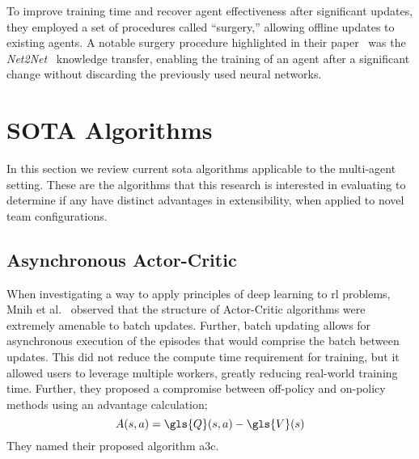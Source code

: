 To improve training time and recover agent effectiveness after 
significant updates, they employed a set of procedures called 
``surgery,'' allowing offline updates to existing agents. 
A notable surgery procedure highlighted in their paper~\cite{berner2019} 
was the \emph{Net2Net}~\cite{chen2016} knowledge transfer, 
enabling the training of an agent after a significant change 
without discarding the previously used neural networks.




\section{SOTA Algorithms} 

In this section we review current \gls{sota} algorithms
applicable to the multi-agent setting.
These are the algorithms that this research is interested 
in evaluating to determine if any have distinct advantages
in extensibility, when applied to novel team configurations.

%

    \subsection*{Asynchronous Actor-Critic}

When investigating a way to apply principles of deep learning to \gls{rl}
problems, Mnih et al.~\cite{mnih2016} observed that the structure of
Actor-Critic algorithms were extremely amenable to batch updates.
Further, batch updating allows for asynchronous execution of 
the episodes that would comprise the batch between updates.
This did not reduce the compute time requirement for training, 
but it allowed users to leverage multiple workers, 
greatly reducing real-world training time.
Further, they proposed a compromise between off-policy and on-policy
methods using an advantage calculation;
\begin{equation}
    A(s,a) = \gls{Q}(s,a) - \gls{V}(s)
\end{equation}
They named their proposed algorithm \gls{a3c}.

